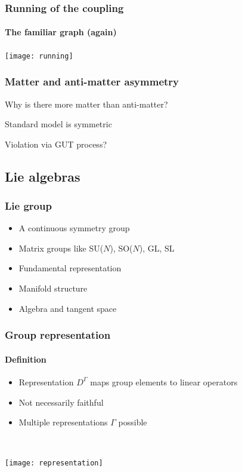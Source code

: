 \documentclass[english, fleqn]{beamer}
\begin{document}
\begin{frame}
    \frametitle{Running of the coupling}
    \framesubtitle{The familiar graph (again)}

    {
        \centering
        \texttt{[image: running]}
    }

    \parencite{Peskin/1997ez}
\end{frame}

\begin{frame}

    \frametitle{Matter and anti-matter asymmetry}

    Why is there more matter than anti-matter?

    Standard model is symmetric

    Violation via GUT process?
\end{frame}

\subsection{Lie algebras}

\begin{frame}
    \frametitle{Lie group}

    \begin{itemize}
        \item A continuous symmetry group
        \item Matrix groups like SU($N$), SO($N$), GL, SL
        \item Fundamental representation
        \item Manifold structure
        \item Algebra and tangent space
    \end{itemize}

\end{frame}

\begin{frame}
    \frametitle{Group representation}
    \framesubtitle{Definition}

    \begin{itemize}
        \item Representation $D^\Gamma$ maps group elements to linear operators
        \item Not necessarily faithful
        \item Multiple representations $\Gamma$ possible
    \end{itemize}

    \

    \begin{center}
        \texttt{[image: representation]}
    \end{center}
\end{frame}
\end{document}
